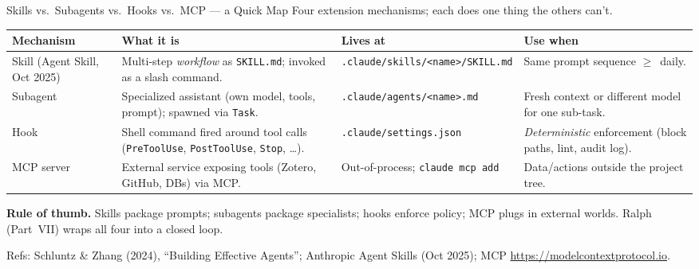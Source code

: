 \documentclass[aspectratio=169,10pt]{beamer}
\newcommand{\emphc}[1]{\textcolor{harvardcrimson}{#1}}
\begin{document}
\begin{frame}[shrink=10]{Skills vs.\ Subagents vs.\ Hooks vs.\ MCP --- a Quick Map}
\scriptsize
Four extension mechanisms; each does one thing the others can't.

\vspace{0.3em}
\renewcommand{\arraystretch}{1.15}
\begin{tabular}{p{1.8cm} p{3.4cm} p{3.8cm} p{3.4cm}}
\toprule
\textbf{Mechanism} & \textbf{What it is} & \textbf{Lives at} & \textbf{Use when} \\
\midrule
\emphc{Skill} (Agent Skill, Oct 2025) &
  Multi-step \emph{workflow} as \texttt{SKILL.md}; invoked as a slash command. &
  \texttt{.claude/skills/<name>/SKILL.md} &
  Same prompt sequence $\geq$~daily. \\
\emphc{Subagent} &
  Specialized assistant (own model, tools, prompt); spawned via \texttt{Task}. &
  \texttt{.claude/agents/<name>.md} &
  Fresh context or different model for one sub-task. \\
\emphc{Hook} &
  Shell command fired around tool calls (\texttt{PreToolUse}, \texttt{Post\-ToolUse}, \texttt{Stop}, \dots). &
  \texttt{.claude/settings.json} &
  \emph{Deterministic} enforcement (block paths, lint, audit log). \\
\emphc{MCP server} &
  External service exposing tools (Zotero, GitHub, DBs) via MCP. &
  Out-of-process; \texttt{claude mcp add} &
  Data/actions outside the project tree. \\
\bottomrule
\end{tabular}

\vspace{0.3em}
\textbf{Rule of thumb.} Skills package prompts; subagents package specialists;
hooks enforce policy; MCP plugs in external worlds. \emphc{Ralph} (Part~VII)
wraps all four into a closed loop.

\vspace{0.1em}
{\tiny Refs: Schluntz \& Zhang (2024), ``Building Effective Agents''; Anthropic Agent Skills (Oct 2025); MCP \url{https://modelcontextprotocol.io}.}
\end{frame}
\end{document}
